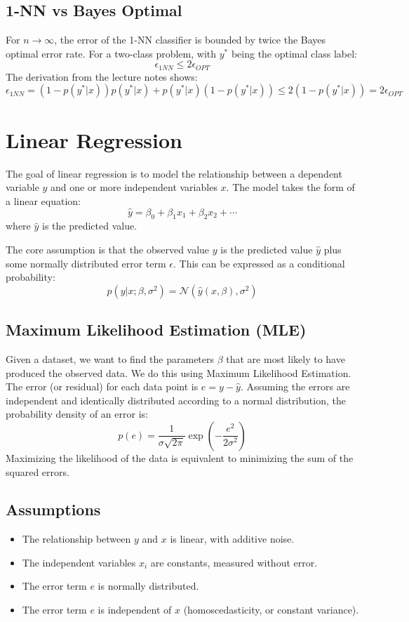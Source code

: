 \documentclass{article}
\begin{document}
\begin{multicols}{2}
\subsection{1-NN vs Bayes Optimal}
For $n \rightarrow \infty$, the error of the 1-NN classifier is bounded by twice the Bayes optimal error rate. 
For a two-class problem, with $y^*$ being the optimal class label:
$$ \epsilon_{1NN} \le 2\epsilon_{OPT} $$
The derivation from the lecture notes shows:
$$ \epsilon_{1NN} = (1-p(y^*|x))p(y^*|x) + p(y^*|x)(1-p(y^*|x)) \le 2(1-p(y^*|x)) = 2\epsilon_{OPT} $$ 


\section{Linear Regression}

The goal of linear regression is to model the relationship between a dependent variable $y$ and one or more independent variables $x$.
The model takes the form of a linear equation:
$$ \hat{y} = \beta_0 + \beta_1 x_1 + \beta_2 x_2 + \cdots $$
where $\hat{y}$ is the predicted value.

The core assumption is that the observed value $y$ is the predicted value $\hat{y}$ plus some normally distributed error term $\epsilon$. This can be expressed as a conditional probability:
$$ p(y|x; \beta, \sigma^2) = \mathcal{N}(\hat{y}(x, \beta), \sigma^2) $$

\subsection{Maximum Likelihood Estimation (MLE)}
Given a dataset, we want to find the parameters $\beta$ that are most likely to have produced the observed data. We do this using Maximum Likelihood Estimation. The error (or residual) for each data point is $e = y - \hat{y}$. Assuming the errors are independent and identically distributed according to a normal distribution, the probability density of an error is:
$$ p(e) = \frac{1}{\sigma\sqrt{2\pi}} \exp\left(-\frac{e^2}{2\sigma^2}\right) $$
Maximizing the likelihood of the data is equivalent to minimizing the sum of the squared errors.

\subsection{Assumptions}
\begin{itemize}
    \item The relationship between $y$ and $x$ is linear, with additive noise.
    \item The independent variables $x_i$ are constants, measured without error.
    \item The error term $e$ is normally distributed.
    \item The error term $e$ is independent of $x$ (homoscedasticity, or constant variance).
\end{itemize}


\end{multicols}
\end{document}
